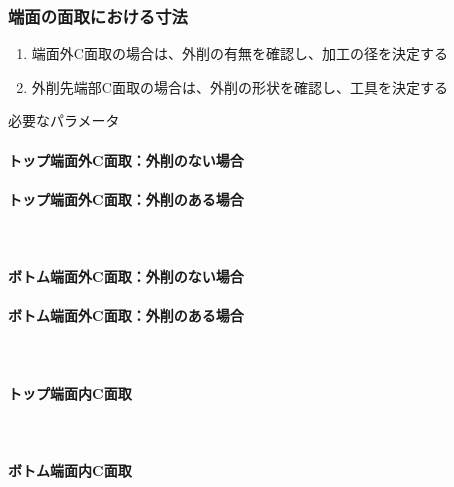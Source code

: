 \subsubsection{端面の面取における寸法}
\begin{enumerate}
\item {}端面外C面取の場合は、外削の有無を確認し、加工の径を決定する
\item {}外削先端部C面取の場合は、外削の形状を確認し、工具を決定する
\end{enumerate}
\begin{Parameter}{必要なパラメータ}
\paragraph*{トップ端面外C面取：外削のない場合}
\PMACOD\PMBDOD{}\PMODCornerR
\tcbline*
\paragraph*{トップ端面外C面取：外削のある場合}
\\
\tcbline*
\paragraph*{ボトム端面外C面取：外削のない場合}
\PMACOD\PMBDOD{}\PMODCornerR
\tcbline*
\paragraph*{ボトム端面外C面取：外削のある場合}
\\
\tcbline*
\paragraph*{トップ端面内C面取}
\PMTopEndACID\PMTopEndBDID\PMTopEndIDCornerR\\
\PMPlatingThk
\tcbline*
\paragraph*{ボトム端面内C面取}
\PMBottomEndACID\PMBottomEndBDID\PMBottomEndIDCornerR\\
\PMPlatingThk
\end{Parameter}

